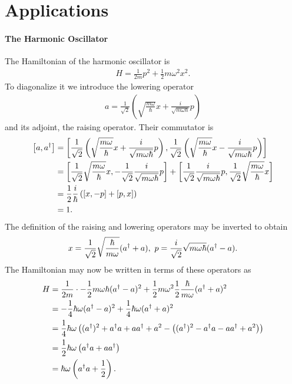 \section{Applications}

\paragraph{The Harmonic Oscillator}
The Hamiltonian of the harmonic oscillator is
\begin{align*}
	H = \frac{1}{2m}p^{2} + \frac{1}{2}m\omega^{2}x^{2}.
\end{align*}
To diagonalize it we introduce the lowering operator
\begin{align*}
	a = \frac{1}{\sqrt{2}}\left(\sqrt{\frac{m\omega}{\hbar}}x + \frac{i}{\sqrt{m\omega\hbar}}p\right)
\end{align*}
and its adjoint, the raising operator. Their commutator is
\begin{align*}
	\comm{a}{\adj{a}} &= \comm{\frac{1}{\sqrt{2}}\left(\sqrt{\frac{m\omega}{\hbar}}x + \frac{i}{\sqrt{m\omega\hbar}}p\right)}{\frac{1}{\sqrt{2}}\left(\sqrt{\frac{m\omega}{\hbar}}x - \frac{i}{\sqrt{m\omega\hbar}}p\right)} \\
	                  &= \comm{\frac{1}{\sqrt{2}}\sqrt{\frac{m\omega}{\hbar}}x}{-\frac{1}{\sqrt{2}}\frac{i}{\sqrt{m\omega\hbar}}p} + \comm{\frac{1}{\sqrt{2}}\frac{i}{\sqrt{m\omega\hbar}}p}{\frac{1}{\sqrt{2}}\sqrt{\frac{m\omega}{\hbar}}x} \\
	                  &= \frac{1}{2}\frac{i}{\hbar}\left(\comm{x}{-p} + \comm{p}{x}\right) \\
	                  &= 1.
\end{align*}
The definition of the raising and lowering operators may be inverted to obtain
\begin{align*}
	x = \frac{1}{\sqrt{2}}\sqrt{\frac{\hbar}{m\omega}}(a^{\dagger} + a),\ p = \frac{i}{\sqrt{2}}\sqrt{m\omega\hbar}(a^{\dagger} - a).
\end{align*}
The Hamiltonian may now be written in terms of these operators as
\begin{align*}
	H &= \frac{1}{2m}\cdot -\frac{1}{2}m\omega\hbar(a^{\dagger} - a)^{2} + \frac{1}{2}m\omega^{2}\frac{1}{2}\frac{\hbar}{m\omega}(a^{\dagger} + a)^{2} \\
	  &= -\frac{1}{4}\hbar\omega(a^{\dagger} - a)^{2} + \frac{1}{4}\hbar\omega(a^{\dagger} + a)^{2} \\
	  &= \frac{1}{4}\hbar\omega\left((a^{\dagger})^{2} + a^{\dagger}a + aa^{\dagger} + a^{2} - \left((a^{\dagger})^{2} - a^{\dagger}a - aa^{\dagger} + a^{2}\right)\right) \\
	  &= \frac{1}{2}\hbar\omega\left(a^{\dagger}a + aa^{\dagger}\right) \\
	  &= \hbar\omega\left(a^{\dagger}a + \frac{1}{2}\right).
\end{align*}
